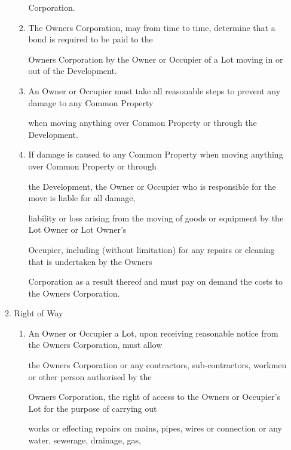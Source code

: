 \documentclass{article}
\begin{document}
\begin{enumerate}[label=\arabic*.]
\begin{enumerate}[label=\arabic{enumi}.\arabic*.]
\begin{enumerate}[label=(\arabic*)]
{\fontsize{10.02}{1}Corporation. }

\item {\fontsize{9.962}{1} The Owners Corporation, may from time to time, determine that a bond is required to be paid to the }

{\fontsize{10.02}{1}Owners Corporation by the Owner or Occupier of a Lot moving in or out of the Development. }

\item {\fontsize{9.962}{1} An Owner or Occupier must take all reasonable steps to prevent any damage to any Common Property }

{\fontsize{10.02}{1}when moving anything over Common Property or through the Development. }

\item {\fontsize{9.962}{1} If damage is caused to any Common Property when moving anything over Common Property or through }

{\fontsize{10.02}{1}the Development, the Owner or Occupier who is responsible for the move is liable for all damage, }

{\fontsize{10.02}{1}liability or loss arising from the moving of goods or equipment by the Lot Owner or Lot Owner’s }

{\fontsize{10.02}{1}Occupier, including (without limitation) for any repairs or cleaning that is undertaken by the Owners }

{\fontsize{10.02}{1}Corporation as a result thereof and must pay on demand the costs to the Owners Corporation. }

\newpage

\end{enumerate}
\item {\fontsize{9.99}{1} Right of Way }

\begin{enumerate}[label=(\arabic*)]
\item {\fontsize{9.962}{1} An Owner or Occupier a Lot, upon receiving reasonable notice from the Owners Corporation, must allow }

{\fontsize{10.02}{1}the Owners Corporation or any contractors, sub-contractors, workmen or other person authorised by the }

{\fontsize{10.02}{1}Owners Corporation, the right of access to the Owners or Occupier’s Lot for the purpose of carrying out }

{\fontsize{10.02}{1}works or effecting repairs on mains, pipes, wires or connection or any water, sewerage, drainage, gas, }


\end{enumerate}
\end{enumerate}
\end{enumerate}
\end{document}
